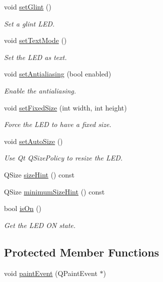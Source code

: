 \begin{DoxyCompactItemize}
void \hyperlink{classmdt_led_a8ec814fdc4910476e7479649ba3f6204}{set\-Glint} ()
\begin{DoxyCompactList}\small\item\em Set a glint L\-E\-D. \end{DoxyCompactList}\item 
void \hyperlink{classmdt_led_a6aabb78ea686814f316f88e20d024d39}{set\-Text\-Mode} ()
\begin{DoxyCompactList}\small\item\em Set the L\-E\-D as text. \end{DoxyCompactList}\item 
void \hyperlink{classmdt_led_ab8a997e610a2ad5572e1a6dbe7fbc256}{set\-Antialiasing} (bool enabled)
\begin{DoxyCompactList}\small\item\em Enable the antialiasing. \end{DoxyCompactList}\item 
void \hyperlink{classmdt_led_abd0fde0ce1eca75fe7c832557829089b}{set\-Fixed\-Size} (int width, int height)
\begin{DoxyCompactList}\small\item\em Force the L\-E\-D to have a fixed size. \end{DoxyCompactList}\item 
void \hyperlink{classmdt_led_a696570e6eb8f5b0a629fc6823ed2fe4d}{set\-Auto\-Size} ()
\begin{DoxyCompactList}\small\item\em Use Qt Q\-Size\-Policy to resize the L\-E\-D. \end{DoxyCompactList}\item 
Q\-Size \hyperlink{classmdt_led_a44cf6e19e2640bc843d1ed096843e686}{size\-Hint} () const 
\item 
Q\-Size \hyperlink{classmdt_led_ae7d22257f19d57771299b321a8a17c50}{minimum\-Size\-Hint} () const 
\item 
bool \hyperlink{classmdt_led_a97c9b46867c260cb27901e2968146809}{is\-On} ()
\begin{DoxyCompactList}\small\item\em Get the L\-E\-D O\-N state. \end{DoxyCompactList}\end{DoxyCompactItemize}
\subsection*{Protected Member Functions}
\begin{DoxyCompactItemize}
\item 
void \hyperlink{classmdt_led_a1c96c8e06658ba569f7cf6b3fc3f5903}{paint\-Event} (Q\-Paint\-Event $\ast$)
\end{DoxyCompactItemize}


